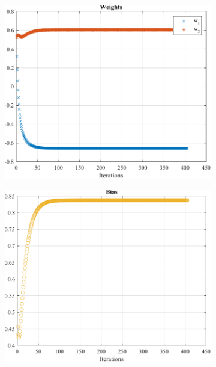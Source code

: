 \begin{figure}[htpb]
	\centering
	\begin{subfigure}[l]{0.3\textwidth}
		\centering
		\includegraphics[width=\textwidth]{../Problem 10/prob10_adaline_weights.pdf}
		\caption{}
	\end{subfigure}
	\hspace{1mm}
	\begin{subfigure}[c]{0.3\textwidth}
		\centering
		\includegraphics[width=\textwidth]{../Problem 10/prob10_adaline_biases.pdf}
		\caption{}

\end{subfigure}
\end{figure}
